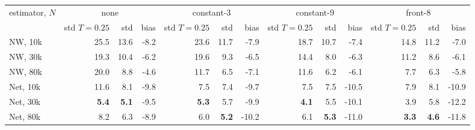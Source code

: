 \begin{tabular}{l rrr rrr rrr rrr}
\toprule
estimator, $N$ & \multicolumn{3}{c}{none} & \multicolumn{3}{c}{constant-3} & \multicolumn{3}{c}{constant-9} & \multicolumn{3}{c}{front-8}\\
& std $T{=}0.25$ & std & bias & std $T{=}0.25$ & std & bias & std $T{=}0.25$ & std & bias & std $T{=}0.25$ & std & bias\\
\midrule
NW, 10k & 25.5 & 13.6 & -8.2 & 23.6 & 11.7 & -7.9 & 18.7 & 10.7 & -7.4 & 14.8 & 11.2 & -7.0\\
NW, 30k & 19.3 & 10.4 & -6.2 & 19.6 & 9.3 & -6.5 & 14.4 & 8.0 & -6.3 & 11.2 & 8.6 & -6.1\\
NW, 80k & 20.0 & 8.8 & -4.6 & 11.7 & 6.5 & -7.1 & 11.6 & 6.2 & -6.1 & 7.7 & 6.3 & -5.8\\
Net, 10k & 11.6 & 8.1 & -9.8 & 7.5 & 7.4 & -9.7 & 7.5 & 7.5 & -10.5 & 7.9 & 8.1 & -10.9\\
Net, 30k & \textbf{5.4} & \textbf{5.1} & -9.5 & \textbf{5.3} & 5.7 & -9.9 & \textbf{4.1} & 5.5 & -10.1 & 3.9 & 5.8 & -12.2\\
Net, 80k & 8.2 & 6.3 & -8.9 & 6.0 & \textbf{5.2} & -10.2 & 6.1 & \textbf{5.3} & -11.0 & \textbf{3.3} & \textbf{4.6} & -11.8\\
\bottomrule
\end{tabular}
